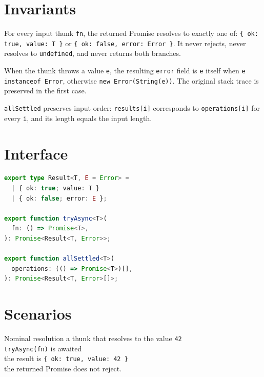 \section{Invariants}
\begin{invariant}
For every input thunk \texttt{fn}, the returned Promise resolves to exactly one of:
\texttt{\{ ok: true, value: T \}} or \texttt{\{ ok: false, error: Error \}}. It never rejects, never resolves to \texttt{undefined}, and never returns both branches.
\end{invariant}

\begin{invariant}
When the thunk throws a value \texttt{e}, the resulting \texttt{error} field is \texttt{e} itself when \texttt{e instanceof Error}, otherwise \texttt{new Error(String(e))}. The original stack trace is preserved in the first case.
\end{invariant}

\begin{invariant}
\texttt{allSettled} preserves input order: \texttt{results[i]} corresponds to \texttt{operations[i]} for every \texttt{i}, and its length equals the input length.
\end{invariant}

\section{Interface}

\begin{lstlisting}[language=TypeScript]
export type Result<T, E = Error> =
  | { ok: true; value: T }
  | { ok: false; error: E };

export function tryAsync<T>(
  fn: () => Promise<T>,
): Promise<Result<T, Error>>;

export function allSettled<T>(
  operations: (() => Promise<T>)[],
): Promise<Result<T, Error>[]>;
\end{lstlisting}

\section{Scenarios}

\begin{scenario}{Nominal resolution}
\Given a thunk that resolves to the value \texttt{42} \\
\When \texttt{tryAsync(fn)} is awaited \\
\Then the result is \texttt{\{ ok: true, value: 42 \}} \\
\And the returned Promise does not reject.
\end{scenario}

